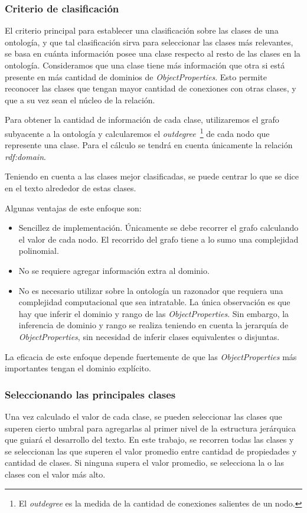 \subsubsection{Criterio de clasificación}
El criterio principal para establecer una clasificación sobre las clases de una ontología, y que tal clasificación sirva para seleccionar las clases más relevantes, se basa en cuánta información posee una clase respecto al resto de las clases en la ontología. Consideramos que una clase tiene más información que otra si está presente en más cantidad de dominios de \emph{ObjectProperties}. Esto permite reconocer las clases que tengan mayor cantidad de conexiones con otras clases, y que a su vez sean el núcleo de la relación. 

Para obtener la cantidad de información de cada clase, utilizaremos el grafo subyacente a la ontología y calcularemos el \emph{outdegree}~\footnote{El \emph{outdegree} es la medida de la cantidad de conexiones salientes de un nodo.} de cada nodo que represente una clase. Para el cálculo se tendrá en cuenta únicamente la relación \emph{rdf:domain}.

Teniendo en cuenta a las clases mejor clasificadas, se puede centrar lo que se dice en el texto alrededor de estas clases.

Algunas ventajas de este enfoque son:
\begin{itemize}
    \item Sencillez de implementación. Únicamente se debe recorrer el grafo calculando el valor de cada nodo. El recorrido del grafo tiene a lo sumo una complejidad polinomial.
    \item No se requiere agregar información extra al dominio.
    \item No es necesario utilizar sobre la ontología un razonador que requiera una complejidad computacional que sea intratable. La única observación es que hay que inferir el dominio y rango de las \emph{ObjectProperties}. Sin embargo, la inferencia de dominio y rango se realiza teniendo en cuenta la jerarquía de \emph{ObjectProperties}, sin necesidad de inferir clases equivalentes o disjuntas.
\end{itemize}

La eficacia de este enfoque depende fuertemente de que las \emph{ObjectProperties} más importantes tengan el dominio explícito.


\subsubsection{Seleccionando las principales clases}
\label{sec:select_class}
Una vez calculado el valor de cada clase, se pueden seleccionar las clases que superen cierto umbral para agregarlas al primer nivel de la estructura jerárquica que guiará el desarrollo del texto. En este trabajo, se recorren todas las clases y se seleccionan las que superen el valor promedio entre cantidad de propiedades y cantidad de clases.
Si ninguna supera el valor promedio, se selecciona la o las clases con el valor más alto.

